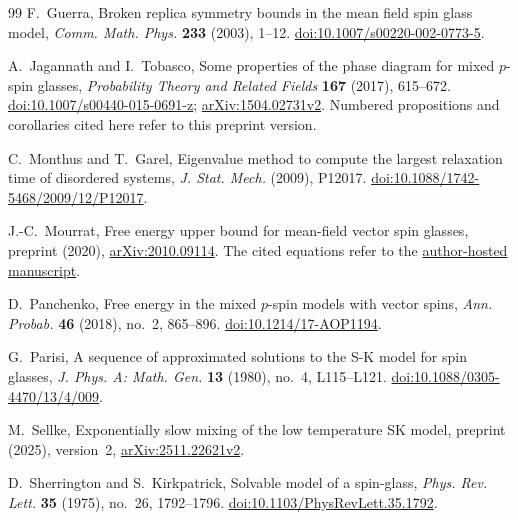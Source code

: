 \begin{thebibliography}{99}
F.~Guerra,
\newblock Broken replica symmetry bounds in the mean field spin glass model,
\newblock \emph{Comm. Math. Phys.} \textbf{233} (2003), 1--12.
\newblock \href{https://doi.org/10.1007/s00220-002-0773-5}{doi:10.1007/s00220-002-0773-5}.

A.~Jagannath and I.~Tobasco,
\newblock Some properties of the phase diagram for mixed $p$-spin glasses,
\newblock \emph{Probability Theory and Related Fields}
\textbf{167} (2017), 615--672.
\newblock \href{https://doi.org/10.1007/s00440-015-0691-z}{doi:10.1007/s00440-015-0691-z};
\href{https://arxiv.org/abs/1504.02731v2}{arXiv:1504.02731v2}.
Numbered propositions and corollaries cited here refer to this preprint version.

C.~Monthus and T.~Garel,
\newblock Eigenvalue method to compute the largest relaxation time of disordered systems,
\newblock \emph{J. Stat. Mech.} (2009), P12017.
\newblock \href{https://doi.org/10.1088/1742-5468/2009/12/P12017}{doi:10.1088/1742-5468/2009/12/P12017}.

J.-C.~Mourrat,
\newblock Free energy upper bound for mean-field vector spin glasses,
\newblock preprint (2020),
\href{https://arxiv.org/abs/2010.09114}{arXiv:2010.09114}.
\newblock The cited equations refer to the
\href{https://perso.ens-lyon.fr/jean-christophe.mourrat/genbound.pdf}{author-hosted manuscript}.

D.~Panchenko,
\newblock Free energy in the mixed $p$-spin models with vector spins,
\newblock \emph{Ann. Probab.} \textbf{46} (2018), no.~2, 865--896.
\newblock \href{https://doi.org/10.1214/17-AOP1194}{doi:10.1214/17-AOP1194}.

G.~Parisi,
\newblock A sequence of approximated solutions to the S-K model for spin glasses,
\newblock \emph{J. Phys. A: Math. Gen.} \textbf{13} (1980), no.~4, L115--L121.
\newblock \href{https://doi.org/10.1088/0305-4470/13/4/009}{doi:10.1088/0305-4470/13/4/009}.

M.~Sellke,
\newblock Exponentially slow mixing of the low temperature SK model,
\newblock preprint (2025), version~2, \href{https://arxiv.org/abs/2511.22621v2}{arXiv:2511.22621v2}.

D.~Sherrington and S.~Kirkpatrick,
\newblock Solvable model of a spin-glass,
\newblock \emph{Phys. Rev. Lett.} \textbf{35} (1975), no.~26, 1792--1796.
\newblock \href{https://doi.org/10.1103/PhysRevLett.35.1792}{doi:10.1103/PhysRevLett.35.1792}.


\end{thebibliography}
